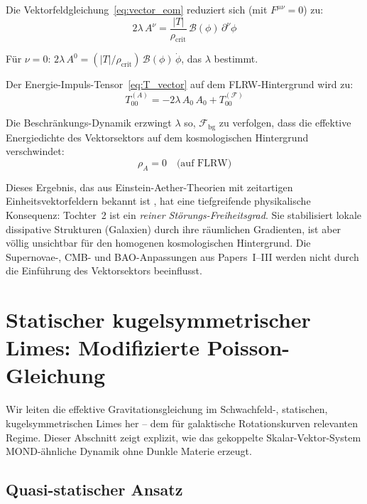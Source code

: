 \documentclass[aps,prd,twocolumn,superscriptaddress,nofootinbib]{revtex4-2}
\begin{document}
Die Vektorfeldgleichung~\eqref{eq:vector_eom} reduziert sich (mit $F^{\mu\nu} = 0$) zu:
\begin{equation}
2\lambda\,A^\nu = \frac{|T|}{\rho_{\mathrm{crit}}}\,\mathcal{B}(\phi)\,\partial^\nu\phi
\end{equation}

F\"ur $\nu = 0$: $2\lambda\,A^0 = (|T|/\rho_{\mathrm{crit}})\,\mathcal{B}(\phi)\,\dot{\phi}$, das $\lambda$ bestimmt.

Der Energie-Impuls-Tensor~\eqref{eq:T_vector} auf dem FLRW-Hintergrund wird zu:
\begin{equation}
T^{(A)}_{00} = -2\lambda\,A_0\,A_0 + T^{(\mathcal{F})}_{00}
\end{equation}

Die Beschr\"ankungs-Dynamik erzwingt $\lambda$ so, $\mathcal{F}_{\mathrm{bg}}$ zu verfolgen, dass die effektive Energiedichte des Vektorsektors auf dem kosmologischen Hintergrund verschwindet:
\begin{equation}
\rho_A = 0 \quad\text{(auf FLRW)}
\label{eq:rho_A_zero}
\end{equation}

Dieses Ergebnis, das aus Einstein-Aether-Theorien mit zeitartigen Einheitsvektorfeldern bekannt ist \cite{JacobsonMattingly2001}, hat eine tiefgreifende physikalische Konsequenz: Tochter~2 ist ein \textit{reiner St\"orungs-Freiheitsgrad}. Sie stabilisiert lokale dissipative Strukturen (Galaxien) durch ihre r\"aumlichen Gradienten, ist aber v\"ollig unsichtbar f\"ur den homogenen kosmologischen Hintergrund. Die Supernovae-, CMB- und BAO-Anpassungen aus Papers~I--III werden nicht durch die Einf\"uhrung des Vektorsektors beeinflusst.


\section{Statischer kugelsymmetrischer Limes: Modifizierte Poisson-Gleichung}
\label{sec:spherical}

Wir leiten die effektive Gravitationsgleichung im Schwachfeld-, statischen, kugelsymmetrischen Limes her -- dem f\"ur galaktische Rotationskurven relevanten Regime. Dieser Abschnitt zeigt explizit, wie das gekoppelte Skalar-Vektor-System MOND-\"ahnliche Dynamik ohne Dunkle Materie erzeugt.

\subsection{Quasi-statischer Ansatz}
\label{sec:quasi_static}
\end{document}
